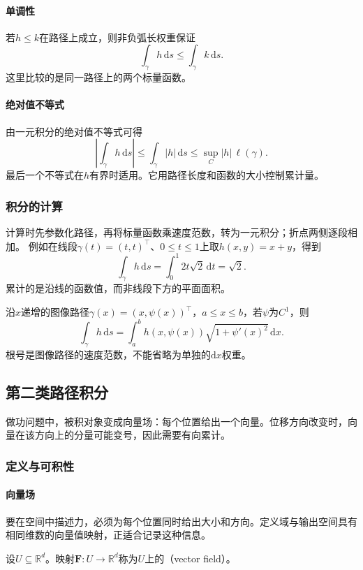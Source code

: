 \paragraph{单调性}

若$h\leq k$在路径上成立，则非负弧长权重保证
\[
 \int_\gamma h\,\mathrm ds\leq\int_\gamma k\,\mathrm ds.
\]
这里比较的是同一路径上的两个标量函数。

\paragraph{绝对值不等式}

由一元积分的绝对值不等式可得
\[
 \left|\int_\gamma h\,\mathrm ds\right|
 \leq\int_\gamma|h|\,\mathrm ds
 \leq\sup_C|h|\,\ell(\gamma).
\]
最后一个不等式在$h$有界时适用。它用路径长度和函数的大小控制累计量。

\subsubsection{积分的计算}

计算时先参数化路径，再将标量函数乘速度范数，转为一元积分；折点两侧逐段相加。
例如在线段$\gamma(t)=(t,t)^\top$、$0\leq t\leq1$上取$h(x,y)=x+y$，得到
\[
 \int_\gamma h\,\mathrm ds=\int_0^1 2t\sqrt2\,\mathrm dt=\sqrt2.
\]
累计的是沿线的函数值，而非线段下方的平面面积。

沿$x$递增的图像路径$\gamma(x)=(x,\psi(x))^\top$，$a\leq x\leq b$，若$\psi$为$C^1$，则
\[
 \int_\gamma h\,\mathrm ds
 =\int_a^b h(x,\psi(x))\sqrt{1+\psi'(x)^2}\,\mathrm dx.
\]
根号是图像路径的速度范数，不能省略为单独的$\mathrm dx$权重。

\subsection{第二类路径积分}

做功问题中，被积对象变成向量场：每个位置给出一个向量。位移方向改变时，向量在该方向上的分量可能变号，因此需要有向累计。

\subsubsection{定义与可积性}

\paragraph{向量场}

要在空间中描述力，必须为每个位置同时给出大小和方向。定义域与输出空间具有相同维数的向量值映射，正适合记录这种信息。
\begin{definition}[向量场]
设$U\subseteq\mathbb R^d$。映射$\bm F:U\to\mathbb R^d$称为$U$上的（vector field）。
\end{definition}

